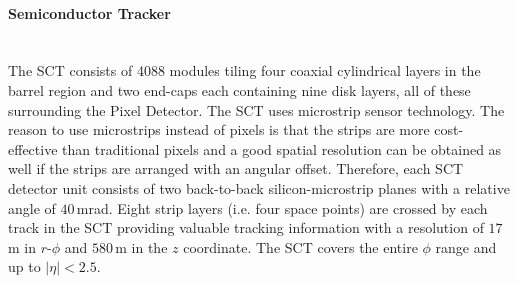 \paragraph{Semiconductor Tracker}\mbox{}\\
\label{sec:Chap2:ID:SCT}
The SCT consists of 4088 modules tiling four coaxial cylindrical layers in the barrel region and two end-caps each containing nine disk
layers, all of these surrounding the Pixel Detector. %
The SCT uses microstrip sensor technology. %
The reason to use microstrips instead of pixels is that the strips are more cost-effective than traditional pixels and a 
good spatial resolution can be obtained as well if the strips are arranged with an angular offset. Therefore, each SCT detector 
unit consists of two back-to-back silicon-microstrip planes with a relative angle of $40\,$mrad.
Eight strip layers (i.e. four space points) are crossed by each track in the SCT providing valuable tracking information with a resolution of 
$17\,$\textmu m in $r$-$\phi$ and $580\,$\textmu m in the $z$ coordinate. The SCT covers the entire $\phi$ range and up to $|\eta| <2.5$.







